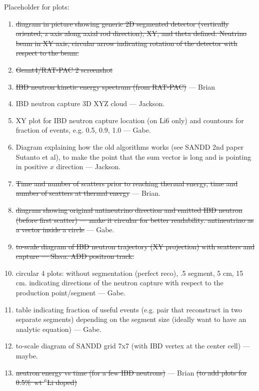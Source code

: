 Placeholder for plots:
\begin{enumerate}
\item \sout{diagram in picture showing generic 2D segmented detector (vertically oriented, z axis along axial rod direction), XY, and theta defined. Neutrino beam in XY axis, circular arrow indicating rotation of the detector with respect to the beam.}
    \item \sout{Geant4/RAT-PAC 2 screenshot}
    \item \sout{IBD neutron kinetic energy spectrum (from RAT-PAC)} --- Brian
    \item IBD neutron capture 3D XYZ cloud  --- Jackson.
    \item XY plot for IBD neutron capture location (on Li6 only) and countours for fraction of events, e.g. 0.5, 0.9, 1.0 --- Gabe.
    \item Diagram explaining how the old algorithms works (see SANDD 2nd paper Sutanto et al), to make the point that the sum vector is long and is pointing in positive $x$ direction --- Jackson.
    \item \sout{Time and number of scatters prior to reaching thermal energy, time and number of scatters at thermal energy} --- Brian.
    \item \sout{diagram showing original antineutrino direction and emitted IBD neutron (before first scatter) --- make it circular for better readability. antineutrino as a vector inside a circle} --- Gabe.
    \item \sout{to-scale diagram of IBD neutron trajectory (XY projection) with scatters and capture --- Slava. ADD positron track.}
    \item circular 4 plots: without segmentation (perfect reco), .5 segment, 5 cm, 15 cm. indicating directions of the neutron capture with respect to the production point/segment --- Gabe.
    \item table indicating fraction of useful events (e.g. pair that reconstruct in two separate segments) depending on the segment size (ideally want to have an analytic equation) --- Gabe.
    \item to-scale diagram of SANDD grid 7x7 (with IBD vertex at the center cell) --- maybe.
    \item \sout{neutron energy vs time (for a few IBD neutrons)} --- Brian \sout{(to add plots for 0.5\%\ wt ${}^6$Li doped)}

\end{enumerate}
